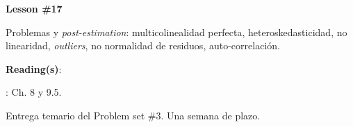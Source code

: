 \documentclass[letterpaper]{article}
\renewenvironment{itemize}{
  \begin{list}{}{
    \setlength{\leftmargin}{1.5em}
  }
}{
  \end{list}
}
\begin{document}
\begin{enumerate}
\begin{itemize}
\begin{itemize}
\begin{itemize}
							\end{itemize}
					\end{itemize}
			\end{itemize}






			\begin{itemize} 
				\item[$\bullet$] {\bf Lesson \#17}
					\begin{itemize} 
						\item[$\circ$] Problemas y \emph{post-estimation}: multicolinealidad perfecta, heteroskedasticidad, no linearidad, \emph{outliers}, no normalidad de residuos, auto-correlaci\'on. %
						\item[$\circ$] {\bf Reading(s)}: 
						\begin{itemize}
						\item[$\diamond$] \textcite{Wooldridge2010}: Ch. 8 y 9.5.
						\end{itemize}
					\end{itemize}
			\end{itemize}




\item[{\color{red}\Pointinghand}] Entrega temario del Problem set \#3. Una semana de plazo.



\end{enumerate}
\end{document}
